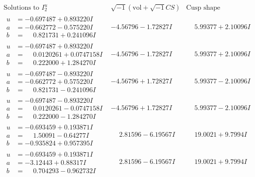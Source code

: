 \documentclass[1p]{elsarticle_modified}
\theoremstyle{definition}
\newcommand{\I}{\sqrt{-1}}
\begin{document}
$$\begin{array}{c|c|c}  
\text{Solutions to }I^u_{2}& \I (\text{vol} + \sqrt{-1}CS) & \text{Cusp shape}\\
 \hline 
\begin{aligned}
u &= -0.697487 + 0.893220 I \\
a &= -0.662772 - 0.575220 I \\
b &= \phantom{-}0.821731 + 0.241096 I\end{aligned}
 & -4.56796 - 1.72827 I & \phantom{-}5.99377 + 2.10096 I \\ \hline\begin{aligned}
u &= -0.697487 + 0.893220 I \\
a &= \phantom{-}0.0120261 + 0.0747158 I \\
b &= \phantom{-}0.222000 + 1.284270 I\end{aligned}
 & -4.56796 - 1.72827 I & \phantom{-}5.99377 + 2.10096 I \\ \hline\begin{aligned}
u &= -0.697487 - 0.893220 I \\
a &= -0.662772 + 0.575220 I \\
b &= \phantom{-}0.821731 - 0.241096 I\end{aligned}
 & -4.56796 + 1.72827 I & \phantom{-}5.99377 - 2.10096 I \\ \hline\begin{aligned}
u &= -0.697487 - 0.893220 I \\
a &= \phantom{-}0.0120261 - 0.0747158 I \\
b &= \phantom{-}0.222000 - 1.284270 I\end{aligned}
 & -4.56796 + 1.72827 I & \phantom{-}5.99377 - 2.10096 I \\ \hline\begin{aligned}
u &= -0.693459 + 0.193871 I \\
a &= \phantom{-}1.50091 - 0.64277 I \\
b &= -0.935824 + 0.957395 I\end{aligned}
 & \phantom{-}2.81596 - 6.19567 I & \phantom{-}19.0021 + 9.7994 I \\ \hline\begin{aligned}
u &= -0.693459 + 0.193871 I \\
a &= -3.12443 + 0.88317 I \\
b &= \phantom{-}0.704293 - 0.962732 I\end{aligned}
 & \phantom{-}2.81596 - 6.19567 I & \phantom{-}19.0021 + 9.7994 I \\ \hline\begin{aligned}

\end{aligned}
\end{array}$$
\end{document}
